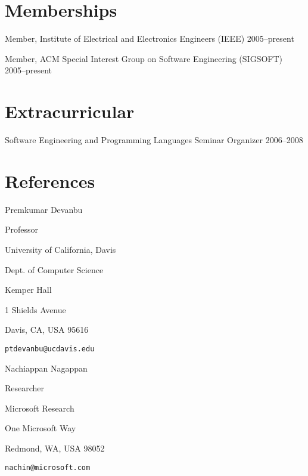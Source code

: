 \documentclass[margin,line,article,letterpaper]{res}
\newenvironment{noindentlist}{
  \begin{list}{}{%
      \setlength{\itemsep}{0in}
      \setlength{\parsep}{0in} \setlength{\parskip}{0in}
      \setlength{\topsep}{0in} \setlength{\partopsep}{0in} 
      \setlength{\leftmargin}{0in}}}{\end{list}}
\newenvironment{list1}{
  \begin{list}{}{%
      \setlength{\itemsep}{0in}
      \setlength{\parsep}{0in} \setlength{\parskip}{0in}
      \setlength{\topsep}{0in} \setlength{\partopsep}{0in} 
      \setlength{\leftmargin}{0.17in}}}{\end{list}}
\newenvironment{list2}{
  \begin{list}{$\bullet$}{%
      \setlength{\itemsep}{0in}
      \setlength{\parsep}{0in} \setlength{\parskip}{0in}
      \setlength{\topsep}{0in} \setlength{\partopsep}{0in} 
      \setlength{\leftmargin}{0.2in}}}{\end{list}}
\newcommand{\timespan}[1]{#1}
\begin{document}
\begin{resume}
\section{Memberships}
\begin{noindentlist}
\item Member, Institute of Electrical and Electronics Engineers (IEEE) \hfill 2005--present
\item Member, ACM Special Interest Group on Software Engineering (SIGSOFT) \hfill 2005--present
\end{noindentlist}



\begin{comment}
I don't think anyone cares about this
\section{Technical Skills} 
\begin{list2}
\item Proficient:  C, Java, Python, C++, PostgreSQL, MySQL, Ruby, R, \LaTeX
\item Familiar: Lisp, Prolog, C\#, SML
\end{list2}
\end{comment}

\section{Extracurricular}
Software Engineering and Programming Languages Seminar Organizer \hfill \timespan{2006--2008}

\section{References}

Premkumar Devanbu
\begin{list1}
\item Professor
\item University of California, Davis
\item Dept. of Computer Science
\item Kemper Hall
\item 1 Shields Avenue
\item Davis, CA, USA 95616
\item \texttt{ptdevanbu@ucdavis.edu}
\end{list1}

Nachiappan Nagappan
\begin{list1}
\item Researcher
\item Microsoft Research
\item One Microsoft Way
\item Redmond, WA, USA 98052
\item \texttt{nachin@microsoft.com}
\end{list1}


\end{resume}
\end{document}
